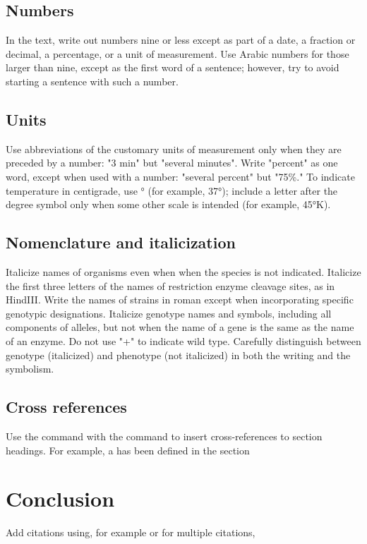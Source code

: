 {\begin{multicols}{2}
    \subsection{Numbers} In the text, write out  numbers nine or less except as part of a date, a fraction or decimal, a percentage, or a unit of measurement. Use Arabic numbers for those larger than nine, except as the first word of a sentence; however, try to avoid starting a sentence with such a number.
    
    \subsection{Units} Use abbreviations of the customary units of measurement only when they are preceded by a number: "3 min" but "several minutes". Write "percent" as one word, except when used with a number: "several percent" but "75\%." To indicate temperature in centigrade, use ° (for example, 37°); include a letter after the degree symbol only when some other scale is intended (for example, 45°K).
    
    \subsection{Nomenclature  and italicization} Italicize  names of organisms even when  when the species is not indicated.  Italicize the first three letters of the names of restriction enzyme cleavage sites, as in HindIII. Write the names of strains in roman except when incorporating specific genotypic designations. Italicize genotype names and symbols, including all components of alleles, but not when the name of a gene is the same as the name of an enzyme. Do not use "+" to indicate wild type. Carefully distinguish between genotype (italicized) and phenotype (not italicized) in both the writing and the symbolism.
    
    \subsection{Cross references}
    Use the  command with the command to insert cross-references to section headings. For example, a has been defined in the section 
    
    \section{Conclusion}
    Add citations using, for example \citep{neher2013genealogies} or for multiple citations, \citealt{rodelsperger2014characterization,neher2013genealogies,Falush16}  \citep{neher2013genealogies}
    

\end{multicols}}
